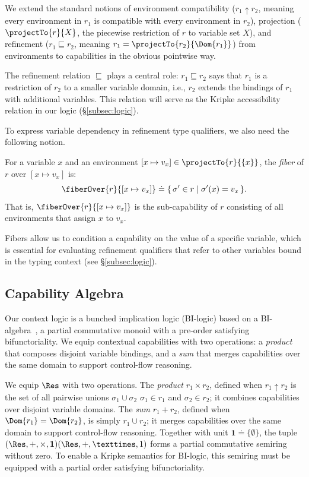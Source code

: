 We extend the standard notions of environment compatibility
($r_1 \uparrow r_2$, meaning every environment in $r_1$ is compatible
with every environment in $r_2$), projection ($\projectTo{r}{X}$, the
piecewise restriction of $r$ to variable set $X$), and refinement
($r_1 \sqsubseteq r_2$, meaning $r_1 = \projectTo{r_2}{\Dom{r_1}}$)
from environments to capabilities in the obvious pointwise way.

The refinement relation $\sqsubseteq$ plays a central role: $r_1
\sqsubseteq r_2$ says that $r_1$ is a restriction of $r_2$ to a
smaller variable domain, i.e., $r_2$ extends the bindings of $r_1$
with additional variables.  This relation will serve as the Kripke
accessibility relation in our logic (\S\ref{subsec:logic}).

To express variable dependency in refinement type qualifiers, we also
need the following notion.

\begin{definition}[Fiber]\label{def:fibers}
  For a variable $x$ and an environment $[x \mapsto v_x] \in
  \projectTo{r}{\{x\}}$, the \emph{fiber} of $r$ over $[x \mapsto
  v_x]$ is:
  \[
    \fiberOver{r}{[x \mapsto v_x]} \doteq \{\, \sigma' \in r \mid
    \sigma'(x) = v_x \,\}.
  \]
  That is, $\fiberOver{r}{[x \mapsto v_x]}$ is the sub-capability of
  $r$ consisting of all environments that assign $x$ to $v_x$.
\end{definition}

\noindent Fibers allow us to condition a capability on the value of a
specific variable, which is essential for evaluating refinement
qualifiers that refer to other variables bound in the typing context
(see \S\ref{subsec:logic}).

\subsection{Capability Algebra}\label{subsec:algebra}

Our context logic is a bunched implication logic (BI-logic) based on a
BI-algebra~\cite{...}, a partial commutative monoid with a pre-order
satisfying bifunctoriality.  We equip contextual capabilities with two
operations: a \emph{product} that composes disjoint variable bindings,
and a \emph{sum} that merges capabilities over the same domain to
support control-flow reasoning.

We equip $\Res$ with two operations. The \emph{product} $r_1 \times
r_2$, defined when $r_1 \uparrow r_2$ is the set of all pairwise
unions $\sigma_1 \cup \sigma_2$ $\sigma_1 \in r_1$ and $\sigma_2 \in
r_2$; it combines capabilities over disjoint variable domains. The
\emph{sum} $r_1 + r_2$​, defined when $\Dom{r_1} = \Dom{r_2}$​, is
simply $r_1 \cup r_2$​; it merges capabilities over the same domain to
support control-flow reasoning. Together with unit $\mathbf{1} \doteq
\{\emptyset\}$, the tuple $(\Res, +, \times, \mathbf{1}) (\Res,+,×,1)$
forms a partial commutative semiring without zero. To enable a Kripke
semantics for BI-logic, this semiring must be equipped with a partial
order satisfying bifunctoriality.


